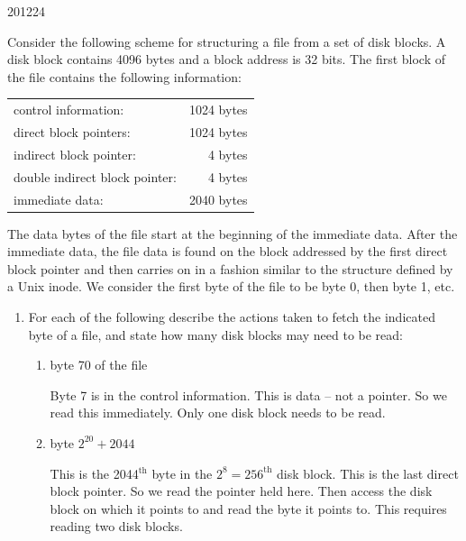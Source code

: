 \documentclass[10pt,\jkfside,a4paper]{article}
\begin{document}
\begin{examquestion}{2012}{2}{4}

Consider the following scheme for structuring a file from a set of disk blocks. A disk
block contains 4096 bytes and a block address is 32 bits. The first block of the file
contains the following information:

\begin{center}
\begin{tabular}{l r}
control information: & 1024 bytes\\
direct block pointers: & 1024 bytes\\
indirect block pointer: & 4 bytes\\
double indirect block pointer: & 4 bytes\\
immediate data: & 2040 bytes\\
\end{tabular}
\end{center}

The data bytes of the file start at the beginning of the immediate data. After the
immediate data, the file data is found on the block addressed by the first direct block
pointer and then carries on in a fashion similar to the structure defined by a Unix
inode. We consider the first byte of the file to be byte 0, then byte 1, etc.

\begin{enumerate}

\item For each of the following describe the actions taken to fetch the indicated byte
of a file, and state how many disk blocks may need to be read:

\begin{enumerate}

\item byte 70 of the file

Byte 7 is in the control information. This is data -- not a pointer. So we read this 
immediately. Only one disk block needs to be read.

\item byte $2^{20} + 2044$

This is the 2044$^\text{th}$ byte in the $2^{8} = 256^\text{th}$ disk block. This is the last 
direct block pointer. So we read the pointer held here. Then access the disk block on which 
it points to and read the byte it points to. This requires reading two disk blocks.

\end{enumerate}


\end{enumerate}
\end{examquestion}
\end{document}
